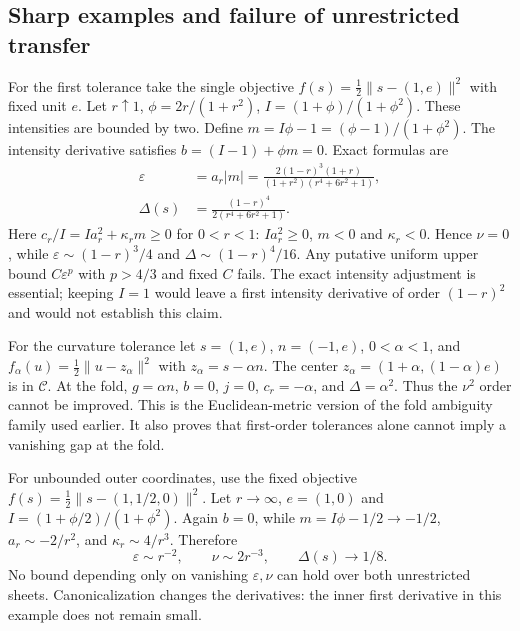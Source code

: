 \documentclass[10pt,a4paper]{article}
\begin{document}
\subsection{Sharp examples and failure of unrestricted transfer}
For the first tolerance take the single objective $f(s)=\tfrac12\|s-(1,e)\|^2$ with fixed unit $e$. Let $r\uparrow1$, $\phi=2r/(1+r^2)$, $I=(1+\phi)/(1+\phi^2)$. These intensities are bounded by two. Define $m=I\phi-1=(\phi-1)/(1+\phi^2)$. The intensity derivative satisfies $b=(I-1)+\phi m=0$. Exact formulas are
\begin{equation}
 \begin{aligned}
 \varepsilon&=a_r|m|
 =\frac{2(1-r)^3(1+r)}{(1+r^2)(r^4+6r^2+1)},\\
 \Delta(s)&=\frac{(1-r)^4}{2(r^4+6r^2+1)}.
 \end{aligned}
 \label{eq:ssharpexact}
\end{equation}
Here $c_r/I=Ia_r^2+\kappa_rm\ge0$ for $0<r<1$: $I a_r^2\ge0$, $m<0$ and $\kappa_r<0$. Hence $\nu=0$, while $\varepsilon\sim(1-r)^3/4$ and $\Delta\sim(1-r)^4/16$. Any putative uniform upper bound $C\varepsilon^p$ with $p>4/3$ and fixed $C$ fails. The exact intensity adjustment is essential; keeping $I=1$ would leave a first intensity derivative of order $(1-r)^2$ and would not establish this claim.

For the curvature tolerance let $s=(1,e)$, $n=(-1,e)$, $0<\alpha<1$, and $f_\alpha(u)=\tfrac12\|u-z_\alpha\|^2$ with $z_\alpha=s-\alpha n$. The center $z_\alpha=(1+\alpha,(1-\alpha)e)$ is in $\mathcal C$. At the fold, $g=\alpha n$, $b=0$, $j=0$, $c_r=-\alpha$, and $\Delta=\alpha^2$. Thus the $\nu^2$ order cannot be improved. This is the Euclidean-metric version of the fold ambiguity family used earlier. It also proves that first-order tolerances alone cannot imply a vanishing gap at the fold.

For unbounded outer coordinates, use the fixed objective $f(s)=\tfrac12\|s-(1,1/2,0)\|^2$. Let $r\to\infty$, $e=(1,0)$ and $I=(1+\phi/2)/(1+\phi^2)$. Again $b=0$, while $m=I\phi-1/2\to-1/2$, $a_r\sim-2/r^2$, and $\kappa_r\sim4/r^3$. Therefore
\begin{equation}
 \varepsilon\sim r^{-2},\qquad\nu\sim2r^{-3},\qquad\Delta(s)\to1/8.
 \label{eq:sstopoutercounter}
\end{equation}
No bound depending only on vanishing $\varepsilon,\nu$ can hold over both unrestricted sheets. Canonicalization changes the derivatives: the inner first derivative in this example does not remain small.
\end{document}
